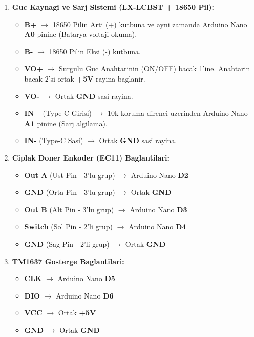 \documentclass[12pt,a4paper]{article}
\begin{document}
\begin{enumerate}
    \item \textbf{Guc Kaynagi ve Sarj Sistemi (LX-LCBST + 18650 Pil):}
    \begin{itemize}
        \item \textbf{B+} $\rightarrow$ 18650 Pilin Arti (+) kutbuna ve ayni zamanda Arduino Nano \textbf{A0} pinine (Batarya voltaji okuma).
        \item \textbf{B-} $\rightarrow$ 18650 Pilin Eksi (-) kutbuna.
        \item \textbf{VO+} $\rightarrow$ Surgulu Guc Anahtarinin (ON/OFF) bacak 1'ine. Anahtarin bacak 2'si ortak \textbf{+5V} rayina baglanir.
        \item \textbf{VO-} $\rightarrow$ Ortak \textbf{GND} sasi rayina.
        \item \textbf{IN+} (Type-C Girisi) $\rightarrow$ 10k koruma direnci uzerinden Arduino Nano \textbf{A1} pinine (Sarj algilama).
        \item \textbf{IN-} (Type-C Sasi) $\rightarrow$ Ortak \textbf{GND} sasi rayina.
    \end{itemize}

    \item \textbf{Ciplak Doner Enkoder (EC11) Baglantilari:}
    \begin{itemize}
        \item \textbf{Out A} (Ust Pin - 3'lu grup) $\rightarrow$ Arduino Nano \textbf{D2}
        \item \textbf{GND} (Orta Pin - 3'lu grup) $\rightarrow$ Ortak \textbf{GND}
        \item \textbf{Out B} (Alt Pin - 3'lu grup) $\rightarrow$ Arduino Nano \textbf{D3}
        \item \textbf{Switch} (Sol Pin - 2'li grup) $\rightarrow$ Arduino Nano \textbf{D4}
        \item \textbf{GND} (Sag Pin - 2'li grup) $\rightarrow$ Ortak \textbf{GND}
    \end{itemize}

    \item \textbf{TM1637 Gosterge Baglantilari:}
    \begin{itemize}
        \item \textbf{CLK} $\rightarrow$ Arduino Nano \textbf{D5}
        \item \textbf{DIO} $\rightarrow$ Arduino Nano \textbf{D6}
        \item \textbf{VCC} $\rightarrow$ Ortak \textbf{+5V}
        \item \textbf{GND} $\rightarrow$ Ortak \textbf{GND}
    \end{itemize}


\end{enumerate}
\end{document}
